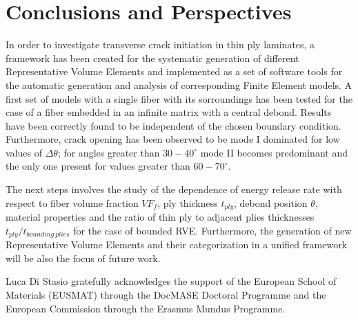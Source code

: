 \documentclass[a4paper]{jpconf}
\begin{document}

\section{Conclusions and Perspectives}
In order to investigate transverse crack initiation in thin ply laminates, a framework has been created for the systematic generation of different Representative Volume Elements and implemented as a set of software tools for the automatic generation and analysis of corresponding Finite Element models. A first set of models with a single fiber with its sorroundings has been tested for the case of a fiber embedded in an infinite matrix with a central debond. Results have been correctly found to be independent of the chosen boundary condition. Furthermore, crack opening has been observed to be mode I dominated for low values of $\Delta\theta$; for angles greater than $30-40^{\circ}$ mode II becomes predominant and the only one present for values greater than $60-70^{\circ}$.\par
The next steps involves the study of the dependence of energy release rate with respect to fiber volume fraction $VF_{f}$, ply thickness $t_{ply}$, debond position $\theta$, material properties and the ratio of thin ply to adjacent plies thicknesses $t_{ply}/t_{bounding\ plies}$ for the case of bounded RVE. Furthermore, the generation of new Representative Volume Elements and their categorization in a unified framework will be also the focus of future work.

\ack
Luca Di Stasio gratefully acknowledges the support of the European School of Materials (EUSMAT) through the DocMASE Doctoral Programme and the European Commission through the Erasmus Mundus Programme.
\newpage


\end{document}
